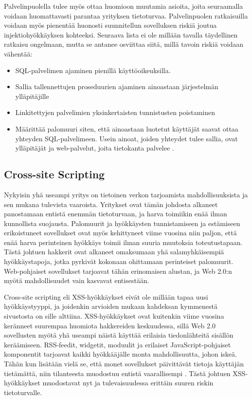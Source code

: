 Palvelinpuolella tulee myös ottaa huomioon muutamia asioita, joita seuraamalla voidaan huomattavasti parantaa yrityksen tietoturvaa.
Palvelinpuolen ratkaisuilla voidaan myös pienentää huonosti suunnitellun sovelluksen riskiä joutua injektiohyökkäyksen kohteeksi. 
Seuraava lista ei ole millään tavalla täydellinen ratkaisu ongelmaan, mutta se antanee osviittaa siitä, millä tavoin riskiä voidaan vähentää:

\begin{itemize}
\item SQL-palvelimen ajaminen pienillä käyttöoikeuksilla.
\item Sallia tallennettujen proseduurien ajaminen ainoastaan järjestelmän ylläpitäjille
\item Linkitettyjen palvelimien yksinkertaisten tunnistusten poistaminen
\item Määrittää palomuuri siten, että ainoastaan luotetut käyttäjät saavat ottaa yhteyden SQL-palvelimeen. Usein ainoat, joiden yhteydet 
      tulee sallia, ovat ylläpitäjät ja web-palvelut, joita tietokanta palvelee \cite{SQL SS}.
\end{itemize}

\subsection{Cross-site Scripting}
Nykyisin yhä useampi yritys on tietoinen verkon tarjoamista mahdollisuuksista ja sen mukana tulevista vaaroista. Yritykset ovat tämän johdosta
alkaneet panostamaan entistä enemmän tietoturvaan, ja harva toimiikin enää ilman kunnollista suojausta. Palomuurit ja hyökkäysten tunnistamiseen
ja estämiseen erikoistuneet sovellukset ovat myös kehittyneet viime vuosina niin paljon, että enää harva perinteinen hyökkäys toimii ilman
suuria muutoksia toteutustapaan. Tästä johtuen hakkerit ovat alkaneet omaksumaan yhä salamyhkäisempiä hyökkäystapoja, jotka pyrkivät kokonaan
ohittamaan perinteiset palomuurit. Web-pohjaiset sovellukset tarjoavat tähän erinomaisen alustan, ja Web 2.0:n myötä mahdollisuudet vain kasvavat
entisestään.

Cross-site scripting eli XSS-hyökkäykset eivät ole millään tapaa uusi hyökkäystyyppi, ja joidenkin arvioiden mukaan kahdeksan kymmenestä sivustosta on 
sille alttiina. XSS-hyökkäykset ovat kuitenkin viime vuosina keränneet suurempaa huomiota hakkereiden keskuudessa, sillä Web 2.0 sovellusten myötä yhä
useampi näistä käyttää erilaisia tiedonlähteitä sisällön keräämiseen. RSS-feedit, widgetit, moduulit ja erilaiset JavaScript-pohjaiset komponentit 
tarjoavat kaikki hyökkääjälle monta mahdollisuutta, johon iskeä. Tähän kun lisätään vielä se, että monet sovellukset päivittävät tietoja käyttäjän tietämättä, 
niin tilanteesta muodostuu entistä vaarallisempi \cite{WEB2b}. Tästä johtuen XSS-hyökkäykset muodostavat nyt ja tulevaisuudessa erittäin suuren riskin
tietoturvalle.

